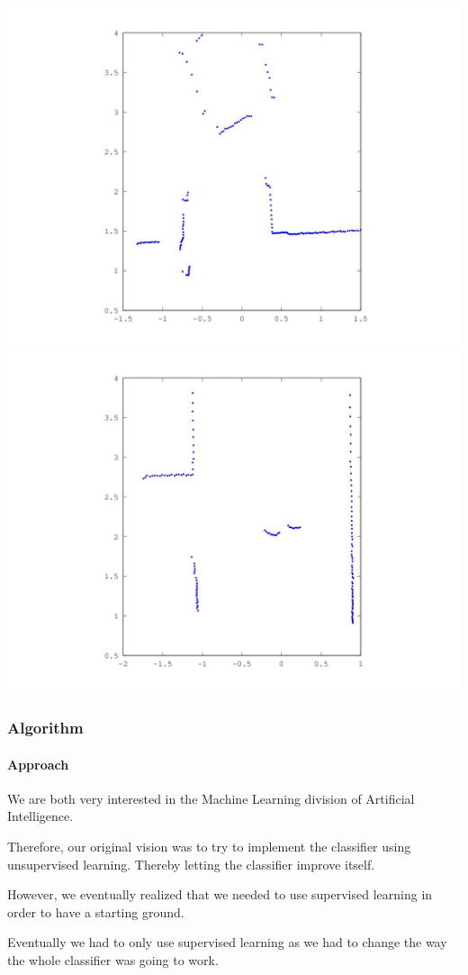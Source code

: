 \documentclass{beamer}
\begin{document}
\begin{frame}
\includegraphics[scale=0.25]{presimg/doorfull.jpg}
\includegraphics[scale=0.25]{presimg/human.jpg}


\end{frame}


\begin{frame}
\frametitle{Algorithm}
\framesubtitle{Approach}

We are both very interested in the Machine Learning division of Artificial Intelligence.

\pause
\vspace{10pt}

Therefore, our original vision was to try to implement the classifier using unsupervised learning. Thereby letting the classifier improve itself.

\pause
\vspace{10pt}

However, we eventually realized that we needed to use supervised learning in order to have a starting ground.


\pause
\vspace{10pt}

Eventually we had to only use supervised learning as we had to change the way the whole classifier was going to work.

\end{frame}
\end{document}
